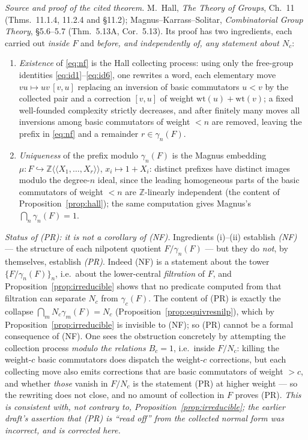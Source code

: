\documentclass{amsart}
\theoremstyle{definition}
\theoremstyle{remark}
\begin{document}
\noindent\emph{Source and proof of the cited theorem.} M.~Hall, \emph{The Theory of Groups},
Ch.~11 (Thms.~11.1.4, 11.2.4 and \S11.2); Magnus--Karrass--Solitar, \emph{Combinatorial Group
Theory}, \S5.6--5.7 (Thm.~5.13A, Cor.~5.13). Its proof has two ingredients, each carried out
\emph{inside $F$} and \emph{before, and independently of, any statement about $N_c$}:
\begin{enumerate}
\item[(i)] \emph{Existence} of \eqref{eq:nf} is the Hall collecting process: using only the
free-group identities \eqref{eq:id1}--\eqref{eq:id6}, one rewrites a word, each elementary move
$vu\mapsto uv\,[v,u]$ replacing an inversion of basic commutators $u<v$ by the collected pair
and a correction $[v,u]$ of weight $\mathrm{wt}(u)+\mathrm{wt}(v)$; a fixed well-founded
complexity strictly decreases, and after finitely many moves all inversions among basic
commutators of weight $<n$ are removed, leaving the prefix in \eqref{eq:nf} and a remainder
$r\in\gamma_n(F)$.
\item[(ii)] \emph{Uniqueness} of the prefix modulo $\gamma_n(F)$ is the Magnus embedding
$\mu\colon F\hookrightarrow\mathbb Z\langle\!\langle X_1,\dots,X_r\rangle\!\rangle$,
$x_i\mapsto1+X_i$: distinct prefixes have distinct images modulo the degree-$n$ ideal, since the
leading homogeneous parts of the basic commutators of weight $<n$ are $\mathbb Z$-linearly
independent (the content of Proposition~\ref{prop:hall}); the same computation gives Magnus's
$\bigcap_n\gamma_n(F)=1$.
\end{enumerate}
\emph{Status of (PR): it is not a corollary of (NF).} Ingredients (i)--(ii) establish
\emph{(NF)} --- the structure of each nilpotent quotient $F/\gamma_n(F)$ --- but they do
\emph{not}, by themselves, establish \emph{(PR)}. Indeed (NF) is a statement about the tower
$\{F/\gamma_n(F)\}_{n}$, i.e.\ about the lower-central \emph{filtration} of $F$, and
Proposition~\ref{prop:irreducible} shows that no predicate computed from that filtration can
separate $N_c$ from $\gamma_c(F)$. The content of (PR) is exactly the collapse
$\bigcap_m N_c\gamma_m(F)=N_c$ (Proposition~\ref{prop:equivresnilp}), which by
Proposition~\ref{prop:irreducible} is invisible to (NF); so (PR) cannot be a formal
consequence of (NF). One sees the obstruction concretely by attempting the collection
process \emph{modulo the relations $B_c=1$}, i.e.\ inside $F/N_c$: killing the weight-$c$
basic commutators does dispatch the weight-$c$ corrections, but each collecting move also
emits corrections that are basic commutators of weight $>c$, and whether \emph{those} vanish
in $F/N_c$ is the statement (PR) at higher weight --- so the rewriting does not close, and no
amount of collection in $F$ proves (PR). \emph{This is consistent with, not contrary to,
Proposition~\ref{prop:irreducible}; the earlier draft's assertion that (PR) is ``read off''
from the collected normal form was incorrect, and is corrected here.}
\end{document}
